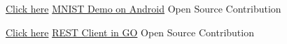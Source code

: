 \begin{cventries}
    \cventry
    {\href{https://goo.gl/AQ9CXM}{Click here}} %
    {\href{https://goo.gl/AQ9CXM}{MNIST Demo on Android}} %
    {Open Source Contribution} %
    {} %
    {
      \begin{cvitems} %
      \end{cvitems}
    }

    \cventry
    {\href{https://goo.gl/xMAZcK}{Click here}} %
    {\href{https://goo.gl/xMAZcK}{REST Client in GO}} %
    {Open Source Contribution} %
    {} %
    {
      \begin{cvitems} %
      \end{cvitems}
    }








\end{cventries}
